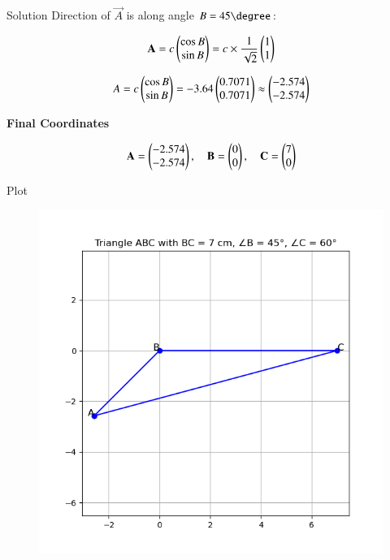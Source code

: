 \documentclass{beamer}
\begin{document}
\begin{frame}{Solution}
Direction of $\vec{A}$ is along angle $B = 45\degree$:

\begin{align}
\mathbf{A} = c \begin{pmatrix}\cos B \\ \sin B\end{pmatrix}
= c \times \frac{1}{\sqrt{2}} \begin{pmatrix}1 \\ 1\end{pmatrix}
\end{align}

\begin{align}
A = c \begin{pmatrix}\cos B \\ \sin B\end{pmatrix} = -3.64 \begin{pmatrix}0.7071 \\ 0.7071\end{pmatrix} \approx \begin{pmatrix}-2.574 \\ -2.574\end{pmatrix}
\end{align}

\textbf{Final Coordinates}

\begin{align}
\mathbf{A} = \begin{pmatrix}-2.574 \\ -2.574\end{pmatrix}, \quad
\mathbf{B} = \begin{pmatrix}0 \\ 0\end{pmatrix}, \quad
\mathbf{C} = \begin{pmatrix}7 \\ 0\end{pmatrix}
\end{align}
\end{frame}


\begin{frame}{Plot}
    \begin{figure}
        \centering
        \includegraphics[width=0.58\linewidth]{./figs/Figure_1.png}
        \caption{}
        \label{fig:fig1}
    \end{figure}
\end{frame}
\end{document}
